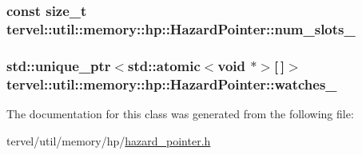 \subsubsection[{num\+\_\+slots\+\_\+}]{\setlength{\rightskip}{0pt plus 5cm}const size\+\_\+t tervel\+::util\+::memory\+::hp\+::\+Hazard\+Pointer\+::num\+\_\+slots\+\_\+\hspace{0.3cm}{\ttfamily [private]}}\label{classtervel_1_1util_1_1memory_1_1hp_1_1_hazard_pointer_ae43516037d461753c977ec58eb545760}
\hypertarget{classtervel_1_1util_1_1memory_1_1hp_1_1_hazard_pointer_abfd4c49d7092b4114b65f763d748c939}{}
\subsubsection[{watches\+\_\+}]{\setlength{\rightskip}{0pt plus 5cm}std\+::unique\+\_\+ptr$<$std\+::atomic$<$void $\ast$$>$\mbox{[}$\,$\mbox{]}$>$ tervel\+::util\+::memory\+::hp\+::\+Hazard\+Pointer\+::watches\+\_\+\hspace{0.3cm}{\ttfamily [private]}}\label{classtervel_1_1util_1_1memory_1_1hp_1_1_hazard_pointer_abfd4c49d7092b4114b65f763d748c939}


The documentation for this class was generated from the following file\+:\begin{DoxyCompactItemize}
\item 
tervel/util/memory/hp/\hyperlink{hazard__pointer_8h}{hazard\+\_\+pointer.\+h}\end{DoxyCompactItemize}

